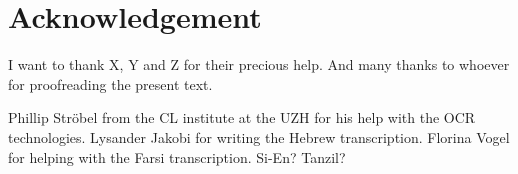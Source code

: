 {}
\chapter*{Acknowledgement}

I want to thank X, Y and Z for their precious help.
And many thanks to whoever for proofreading the present text.

Phillip Ströbel from the CL institute at the UZH for his help with the OCR technologies. 
Lysander Jakobi for writing the Hebrew transcription. Florina Vogel for helping with the Farsi transcription. Si-En? Tanzil?

\newpage